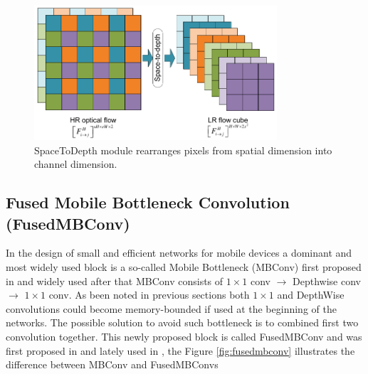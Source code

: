
\begin{figure}[h!]
    \centering
        \includegraphics[clip, trim=0cm 1.4cm 0cm 0cm, height=5cm]{images/space2depth.pdf}
    \caption{SpaceToDepth module rearranges pixels from spatial dimension into channel dimension.} 
    \label{fig:space2depth}
    \end{figure}




\subsection{Fused Mobile Bottleneck Convolution (FusedMBConv)}

In the design of small and efficient networks for mobile devices a dominant and most widely used block is a so-called Mobile Bottleneck (MBConv) first proposed in \cite{howard2017_mobilenetv1} and widely used after that \cite{howard2019_searching_mobilenetv3} %
MBConv consists of $1 \times 1$ conv $\rightarrow$ Depthwise conv $\rightarrow$ $1\times 1$ conv. As been noted in previous sections both $1\times 1$ and DepthWise convolutions could become memory-bounded if used at the beginning of the networks. The possible solution to avoid such bottleneck is to combined first two convolution together. This newly proposed block is called FusedMBConv and was first proposed in \cite{li2021_searching} and lately used in \cite{tan2021_efficientnetv2}, the Figure \ref{fig:fusedmbconv} illustrates the difference between MBConv and FusedMBConvs

